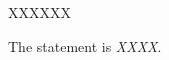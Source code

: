 \documentclass[11pt,letterpaper]{article}
\begin{document}
\thispagestyle{title}

 XXXXXX \par\vspace{0.3cm}

\sol The statement is \textit{XXXX}. \par\vspace{1.3cm}
\end{document}
